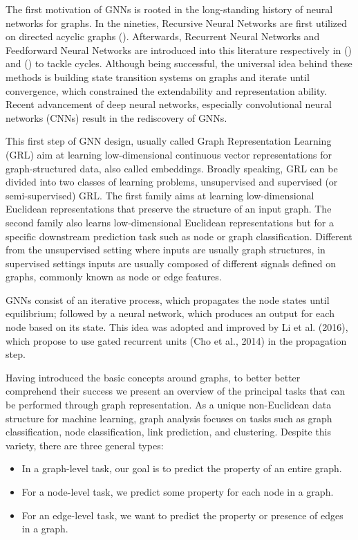 \documentclass[binding=0.6cm]{sapthesis}
\begin{document}
The first motivation of GNNs is rooted in the long-standing history of neural networks for graphs. In the nineties, Recursive Neural Networks are first utilized on directed acyclic graphs (\cite{Sperduti1997,Frasconi1998}). Afterwards, Recurrent Neural Networks and Feedforward Neural Networks are introduced into this literature respectively in (\cite{gnnModel2009}) and (\cite{Micheli2009}) to tackle cycles. Although being successful, the universal idea behind these methods is building state transition systems on graphs and iterate until convergence, which constrained the extendability and representation ability. Recent advancement of deep neural networks, especially convolutional neural networks (CNNs) result in the rediscovery of GNNs. 

This first step of GNN design, usually called Graph Representation Learning (GRL) aim at learning low-dimensional continuous vector representations for graph-structured data, also called embeddings. Broadly speaking, GRL can be divided into two classes of learning problems, unsupervised and supervised (or semi-supervised) GRL. The first family aims at learning low-dimensional Euclidean representations that preserve the structure of an input graph. The second family also learns low-dimensional Euclidean representations but for a specific downstream prediction task such as node or graph classification. Different from the unsupervised setting where inputs are usually graph structures, in supervised settings inputs are usually composed of different signals defined on graphs, commonly known as node or edge features.

GNNs consist of an iterative process, which propagates the node states until equilibrium; followed by a neural network, which produces an output for each node based on its state. This idea was adopted and improved by Li et al. (2016), which propose to use gated recurrent units (Cho et al., 2014) in the propagation step.

Having introduced the basic concepts around graphs, to better better comprehend their success we present an overview of the principal tasks that can be performed through graph representation. As a unique non-Euclidean data structure for machine learning, graph analysis focuses on tasks such as graph classification, node classification, link prediction, and clustering. Despite this variety, there are three general types:
\begin{itemize}
    \item In a graph-level task, our goal is to predict the property of an entire graph.
    \item For a node-level task, we predict some property for each node in a graph. 
    \item For an edge-level task, we want to predict the property or presence of edges in a graph.
\end{itemize}
\end{document}
